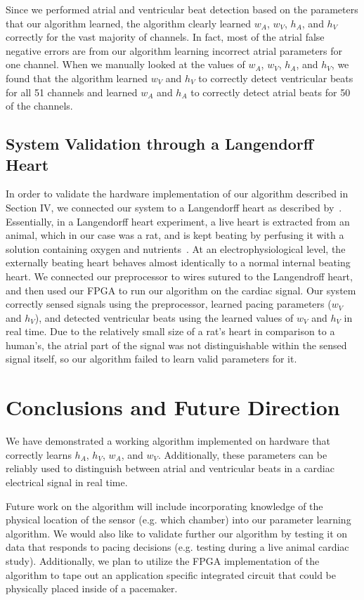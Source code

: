 \documentclass[conference]{IEEEtran}
\newcommand{\APW}{\ensuremath{w_A}}
\newcommand{\VPW}{\ensuremath{w_V}}
\newcommand{\APH}{\ensuremath{h_A}}
\newcommand{\VPH}{\ensuremath{h_V}}
\begin{document}
Since we performed atrial and
ventricular beat detection based on the parameters that
our algorithm learned, the algorithm clearly learned
\APW{}, \VPW{}, \APH{}, and \VPH{} correctly for the vast
majority of channels. In fact, most of the atrial false negative
errors are from our algorithm learning incorrect
atrial parameters for one channel. When we manually
looked at the values of \APW{}, \VPW{}, \APH{}, and \VPH{}, we
found that the algorithm learned \VPW{} and \VPH{} to correctly detect ventricular beats
for all 51 channels and learned \APW{} and \APH{} to correctly detect atrial beats for 50 of 
the channels.

\subsection{System Validation through a Langendorff Heart}
In order to validate the hardware implementation of
our algorithm described in Section IV, we connected our 
system to a Langendorff heart as described by~\cite{langendorff}.
Essentially, in a Langendorff heart experiment, a live
heart is extracted from an animal, which in our case was
a rat, and is kept beating by perfusing it with a solution containing oxygen and nutrients~\cite{langendorff}. 
At an electrophysiological level, the externally beating heart behaves almost identically to a normal internal beating heart.
We connected our preprocessor to wires
sutured to the Langendroff heart, and then used our
FPGA to run our algorithm on the cardiac signal.
Our system correctly sensed signals using
the preprocessor, learned pacing parameters (\VPW{} and
\VPH{}), and detected ventricular beats using the learned
values of \VPW{} and \VPH{} in real time. Due to the
relatively small size of a rat's heart in comparison to a
human's, the atrial part of the signal was not
distinguishable within the sensed signal itself,%
so our algorithm failed to learn valid parameters for it.

\section{Conclusions and Future Direction}
We have demonstrated a working algorithm
implemented on hardware that correctly learns \APH{},
\VPH{}, \APW{}, and \VPW{}. Additionally, these parameters
can be reliably used to distinguish between atrial and
ventricular beats in a cardiac electrical signal in real time.

Future work on the algorithm will include incorporating knowledge of the physical location of the sensor (e.g. which chamber) into our parameter learning algorithm.
We would also like to validate further our algorithm by testing it on data that responds to pacing decisions (e.g. testing during a live animal cardiac study).
Additionally, we plan to utilize the FPGA implementation of
the algorithm to tape out an application specific
integrated circuit that could be physically placed inside
of a pacemaker.
\end{document}
